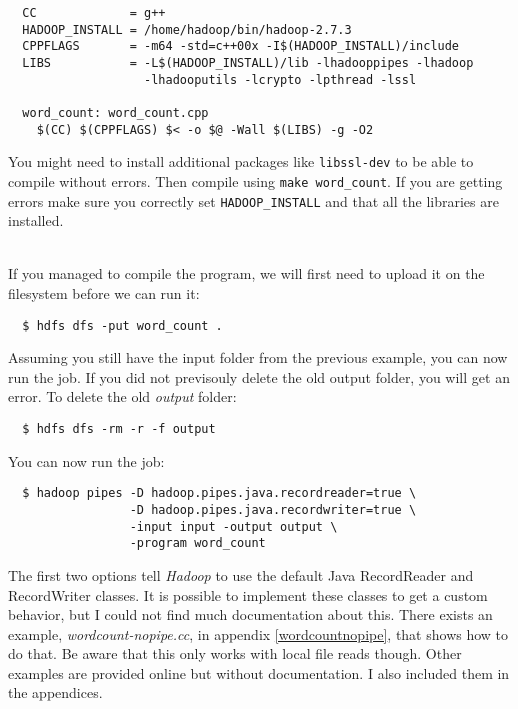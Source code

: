 \documentclass[a4paper, 12pt]{article}
\begin{document}
\begin{verbatim}
  CC             = g++
  HADOOP_INSTALL = /home/hadoop/bin/hadoop-2.7.3
  CPPFLAGS       = -m64 -std=c++00x -I$(HADOOP_INSTALL)/include
  LIBS           = -L$(HADOOP_INSTALL)/lib -lhadooppipes -lhadoop
                   -lhadooputils -lcrypto -lpthread -lssl

  word_count: word_count.cpp
    $(CC) $(CPPFLAGS) $< -o $@ -Wall $(LIBS) -g -O2
\end{verbatim}

You might need to install additional packages like \texttt{libssl-dev} to be able to compile without errors. Then compile using \texttt{make word\_count}. If you are getting errors make sure you correctly set \texttt{HADOOP\_INSTALL} and that all the libraries are installed.

~\\
If you managed to compile the program, we will first need to upload it on the filesystem before we can run it:

\begin{verbatim}
  $ hdfs dfs -put word_count .
\end{verbatim}

Assuming you still have the input folder from the previous example, you can now run the job. If you did not previsouly delete the old output folder, you will get an error. To delete the old \textit{output} folder:

\begin{verbatim}
  $ hdfs dfs -rm -r -f output
\end{verbatim}

You can now run the job:

\begin{verbatim}
  $ hadoop pipes -D hadoop.pipes.java.recordreader=true \
                 -D hadoop.pipes.java.recordwriter=true \
                 -input input -output output \
                 -program word_count
\end{verbatim}

The first two options tell \textit{Hadoop} to use the default Java RecordReader and RecordWriter classes. It is possible to implement these classes to get a custom behavior, but I could not find much documentation about this. There exists an example, \textit{wordcount-nopipe.cc}, in appendix \ref{wordcountnopipe}, that shows how to do that. Be aware that this only works with local file reads though. Other examples are provided online but without documentation. I also included them in the appendices.
\end{document}
